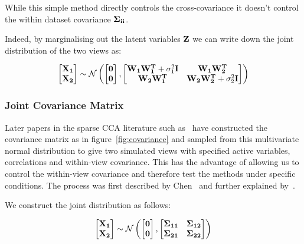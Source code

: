 While this simple method directly controls the cross-covariance it doesn't control the within dataset covariance $\bold{\Sigma_{ii}}$.

Indeed, by marginalising out the latent variables $\bold{Z}$ we can write down the joint distribution of the two views as:

\begin{align}
    \begin{bmatrix} \bold{X_1} \\ \bold{X_2} \end{bmatrix} \sim \mathcal{N} \left( \begin{bmatrix} \bold{0} \\ \bold{0} \end{bmatrix}, \begin{bmatrix} \bold{W_1W_1^T} + \sigma_1^2\bold{I} & \bold{W_1W_2^T} \\ \bold{W_2W_1^T} & \bold{W_2W_2^T} + \sigma_2^2\bold{I} \end{bmatrix} \right)
\end{align}

\subsubsection{Joint Covariance Matrix}
Later papers in the sparse CCA literature such as~\cite{mai2019iterative,chen2013sparse} have constructed the covariance matrix as in figure~\ref{fig:covariance} and sampled from this multivariate normal distribution to give two simulated views with specified active variables, correlations and within-view covariance.
This has the advantage of allowing us to control the within-view covariance and therefore test the methods under specific conditions.
The process was first described by Chen~\cite{chen2013sparse} and further explained by~\cite{suo2017sparse}.

We construct the joint distribution as follows:

\begin{align}\label{eq:covariance}
    \begin{bmatrix} \bold{X_1} \\ \bold{X_2} \end{bmatrix} \sim \mathcal{N} \left( \begin{bmatrix} \bold{0} \\ \bold{0} \end{bmatrix}, \begin{bmatrix} \bold{\Sigma_{11}} & \bold{\Sigma_{12}} \\ \bold{\Sigma_{21}} & \bold{\Sigma_{22}} \end{bmatrix} \right)
\end{align}

